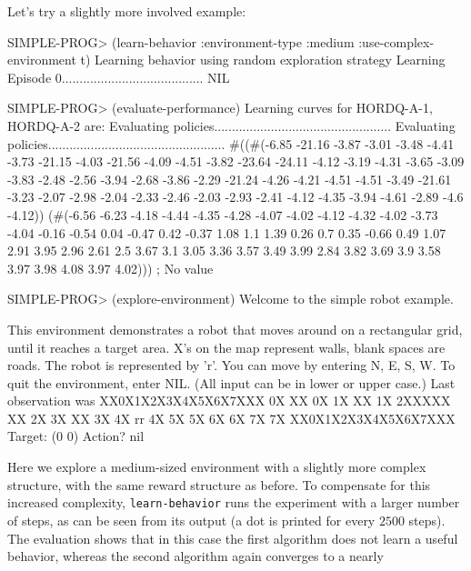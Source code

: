 \documentclass[a4paper]{amsart}
\begin{document}
Let's try a slightly more involved example:
\begin{Code}
  SIMPLE-PROG> (learn-behavior :environment-type :medium
                               :use-complex-environment t)
  Learning behavior using random exploration strategy
  Learning
  Episode 0........................................
  NIL

  SIMPLE-PROG> (evaluate-performance)
  Learning curves for HORDQ-A-1, HORDQ-A-2 are:
  Evaluating policies..................................................
  Evaluating policies..................................................
  #((#(-6.85 -21.16 -3.87 -3.01 -3.48 -4.41
       -3.73 -21.15 -4.03 -21.56 -4.09
       -4.51 -3.82 -23.64 -24.11 -4.12 -3.19
       -4.31 -3.65 -3.09 -3.83 -2.48
       -2.56 -3.94 -2.68 -3.86 -2.29 -21.24
       -4.26 -4.21 -4.51 -4.51 -3.49
       -21.61 -3.23 -2.07 -2.98 -2.04 -2.33
       -2.46 -2.03 -2.93 -2.41 -4.12
       -4.35 -3.94 -4.61 -2.89 -4.6 -4.12))
    (#(-6.56 -6.23 -4.18 -4.44 -4.35 -4.28
       -4.07 -4.02 -4.12 -4.32 -4.02
       -3.73 -4.04 -0.16 -0.54 0.04 -0.47
       0.42 -0.37 1.08 1.1 1.39 0.26 0.7
       0.35 -0.66 0.49 1.07 2.91 3.95 2.96
       2.61 2.5 3.67 3.1 3.05 3.36 3.57
       3.49 3.99 2.84 3.82 3.69 3.9 3.58
       3.97 3.98 4.08 3.97 4.02)))
  ; No value

  SIMPLE-PROG> (explore-environment)
  Welcome to the simple robot example.
  
  This environment demonstrates a robot that moves around on a
  rectangular grid, until it reaches a target area.  X's on the map
  represent walls, blank spaces are roads.  The robot is represented
  by 'r'.  You can move by entering N, E, S, W.  To quit the
  environment, enter NIL.  (All input can be in lower or upper case.)
  Last observation was 
  XX0X1X2X3X4X5X6X7XXX
  0X      XX        0X
  1X      XX        1X
  2XXXXX  XX        2X
  3X      XX        3X
  4X        rr      4X
  5X                5X
  6X                6X
  7X                7X
  XX0X1X2X3X4X5X6X7XXX
  Target: (0 0)
  Action? nil
\end{Code}
Here we explore a medium-sized environment with a slightly more
complex structure, with the same reward structure as before.  To
compensate for this increased complexity, \texttt{learn-behavior} runs
the experiment with a larger number of steps, as can be seen from its
output (a dot is printed for every $2500$ steps).  The evaluation
shows that in this case the first algorithm does not learn a useful
behavior, whereas the second algorithm again converges to a nearly
\end{document}
